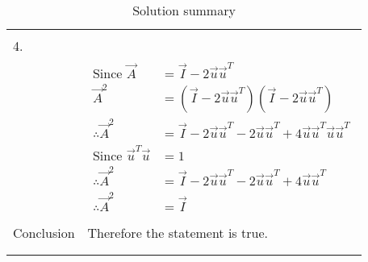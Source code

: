 \documentclass[journal,12pt]{IEEEtran}
\begin{document}
\begin{longtable}{|l|l|}
&\\
\hline
&\\
4.&\\
&\parbox{8cm}{\begin{align*}
    \mbox{Since }\vec{A}&=\vec{I}-2\vec{u}\vec{u}^T\\
    \vec{A}^2&=(\vec{I}-2\vec{u}\vec{u}^T)(\vec{I}-2\vec{u}\vec{u}^T)\\
    \therefore\vec{A}^2&=\vec{I}-2\vec{u}\vec{u}^T-2\vec{u}\vec{u}^T+4\vec{u}\vec{u}^T\vec{u}\vec{u}^T\\
    \mbox{Since }\vec{u}^T\vec{u}&=1\\
    \therefore\vec{A}^2&=\vec{I}-2\vec{u}\vec{u}^T-2\vec{u}\vec{u}^T+4\vec{u}\vec{u}^T\\
    \therefore \vec{A}^2&=\vec{I}
\end{align*}}\\
\hline
&\\
Conclusion&Therefore the statement is true.\\
&\\
\hline
\caption{Solution summary}
\label{table:2}
\end{longtable}
\end{document}
